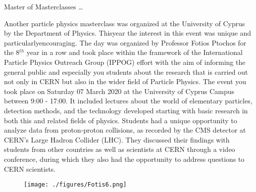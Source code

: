 \begin{MyArticle}[enhanced, tikz={rotate=0}]{Master of Masterclasses \ldots}
  \begin{multicols}{2}
    Another particle physics 
    masterclass was organized at the University of Cyprus by the
    Department of Physics. Thisyear the interest in this event was
    unique and particularlyencouraging. The day  was organized by Professor Fotios Ptochos for the 8$^{th}$ year
    in a row and took place within the framework of the
    International Particle Physics Outreach Group (IPPOG)
    effort with the aim of informing the general
    public and especially you students about the research that is
    carried out not only in CERN but also in the wider field of
    Particle Physics. The event you took place on Saturday 07 March
    2020 at the University of Cyprus Campus between 9:00 - 17:00. It 
    included lectures about the world of elementary particles,
    detection methods, and the technology developed starting with basic research in both this and
    related fields of physics. Students had a unique opportunity to
    analyze data from proton-proton collisions, as recorded by the CMS
    detector at CERN's Large Hadron Collider (LHC). They discussed their
    findings with students from other countries as well as scientists
    at CERN through a video conference, during which they also had the
    opportunity to address questions to CERN scientists. 
    \begin{figure}
      \begin{center}
        \leavevmode
        \texttt{[image: ./figures/Fotis6.png]}
      \end{center}
    \end{figure}
  \end{multicols}
\end{MyArticle}
